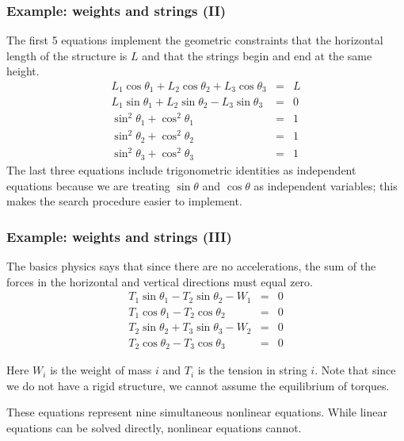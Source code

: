 \documentclass[hyperref={colorlinks=true}]{beamer}
\begin{document}
\begin{frame}%
  \frametitle{Example: weights and strings (II)}

  The first 5 equations implement the geometric constraints that the horizontal length of the structure is $L$ and that the strings begin and end at the same height.
  \begin{eqnarray}
    L_1 \cos\theta_1 + L_2 \cos\theta_2 + L_3 \cos\theta_3 &=& L \\
    L_1 \sin\theta_1 + L_2 \sin\theta_2 - L_3 \sin\theta_3 &=& 0 \\
    \sin^2 \theta_1 + \cos^2 \theta_1                      &=& 1 \\
    \sin^2 \theta_2 + \cos^2 \theta_2                      &=& 1 \\
    \sin^2 \theta_3 + \cos^2 \theta_3                      &=& 1
  \end{eqnarray}
  The last three equations include trigonometric identities as independent equations because we are treating $\sin\theta$ and $\cos\theta$ as independent variables; this makes the search procedure easier to implement.
  
\end{frame}



\begin{frame}%
  \frametitle{Example: weights and strings (III)}

  The basics physics says that since there are no accelerations, the sum of the forces in the horizontal and vertical directions must equal zero.
  \begin{eqnarray}
    T_1 \sin\theta_1 - T_2 \sin\theta_2 - W_1              &=& 0 \\
    T_1 \cos\theta_1 - T_2 \cos\theta_2                    &=& 0 \\
    T_2 \sin\theta_2 + T_3 \sin\theta_3 - W_2              &=& 0 \\
    T_2 \cos\theta_2 - T_3 \cos\theta_3                    &=& 0  
  \end{eqnarray}

  Here $W_i$ is the weight of mass $i$ and $T_i$ is the tension in string $i$. Note that since we do not have
a rigid structure, we cannot assume the equilibrium of torques.
  
  \mysp
  
  These equations represent nine simultaneous nonlinear equations. While linear equations can be solved directly, nonlinear equations cannot.

\end{frame}
\end{document}

